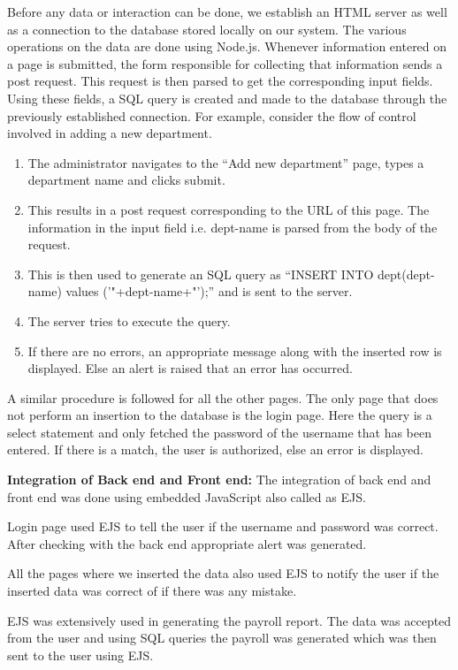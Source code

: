 \documentclass[12pt]{article}
\begin{document}
Before any data or interaction can be done, we establish an HTML server as well as a connection to the database stored locally on our system. 
\newline
\newline
The various operations on the data are done using Node.js. Whenever information entered on a page is submitted, the form responsible for collecting that information sends a post request. This request is then parsed to get the corresponding input fields. Using these fields, a SQL query is created and made to the database through the previously established connection.
\newline
\newline
For example, consider the flow of control involved in adding a new department. 
\begin{enumerate}
    \item The administrator navigates to the “Add new department” page, types a department name and clicks submit.
    \item This results in a post request corresponding to the URL of this page. The information in the input field i.e. dept-name is parsed from the body of the request.
    \item This is then used to generate an SQL query as “INSERT INTO dept(dept-name) values ('"+dept-name+"');” and is sent to the server.
    \item The server tries to execute the query.
    \item If there are no errors, an appropriate message along with the inserted row is displayed. Else an alert is raised that an error has occurred.
\end{enumerate}
A similar procedure is followed for all the other pages. The only page that does not perform an insertion to the database is the login page. Here the query is a select statement and only fetched the password of the username that has been entered. If there is a match, the user is authorized, else an error is displayed.

\newpage
\noindent
\textbf{Integration of Back end and Front end:}
\newline\newline
The integration of back end and front end was done using embedded JavaScript also called as EJS.
\item Login page used EJS to tell the user if the username and password was correct. After checking with the back end appropriate alert was generated.
\item All the pages where we inserted the data also used EJS to notify the user if the inserted data was correct of if there was any mistake.
\item EJS was extensively used in generating the payroll report. The data was accepted from the user and using SQL queries the payroll was generated which was then sent to the user using EJS. 
\end{document}
